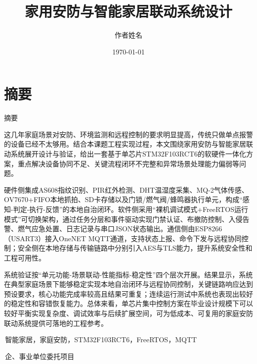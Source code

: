 \documentclass[UTF8,12pt,a4paper,oneside]{ctexbook}
\title{家用安防与智能家居联动系统设计}
\author{作者姓名}
\date{\today}
\numberwithin{equation}{chapter}
\begin{document}
\pagestyle{empty}


\frontmatter
{}
\tableofcontents
\clearpage

\chapter*{摘要}
\begin{center}
{\heiti{}摘要}
\end{center}
这几年家庭场景对安防、环境监测和远程控制的要求明显提高，传统只做单点报警的设备已经不太够用。结合本课题工程实现过程，本文围绕家用安防与智能家居联动系统展开设计与验证，给出一套基于单芯片STM32F103RCT6的软硬件一体化方案，重点解决设备协同不足、关键流程闭环不完整和异常场景处理能力偏弱等问题。

硬件侧集成AS608指纹识别、PIR红外检测、DHT温湿度采集、MQ-2气体传感、OV7670+FIFO本地抓拍、SD卡存储以及门锁/燃气阀/蜂鸣器执行单元，构成“感知-判定-执行-反馈”的本地自治闭环。软件侧采用“裸机调试模式+FreeRTOS运行模式”可切换架构，通过任务分层和事件驱动实现门禁认证、布撤防控制、入侵告警、燃气应急处置、日志记录与串口JSON状态输出。通信侧由ESP8266（USART3）接入OneNET MQTT通道，支持状态上报、命令下发与远程协同控制；安全侧在本地存储与传输链路中分别引入AES与TLS能力，提升系统安全性和工程可用性。

系统验证按“单元功能-场景联动-性能指标-稳定性”四个层次开展。结果显示，系统在典型家庭场景下能够稳定实现本地自治闭环与远程协同控制，关键链路响应达到预设要求，核心功能完成率较高且结果可重复；连续运行测试中系统也表现出较好的稳定性和容错恢复能力。总体来看，单芯片集中控制方案在毕业设计规模下可以较好平衡实现复杂度、调试效率与后续扩展空间，可为低成本、可复用的家庭安防联动系统提供可落地的工程参考。

\vspace{1\baselineskip}
\,智能家居，家庭安防，STM32F103RCT6，FreeRTOS，MQTT

\vspace{0.5\baselineskip}
\,企、事业单位委托项目
\end{document}
